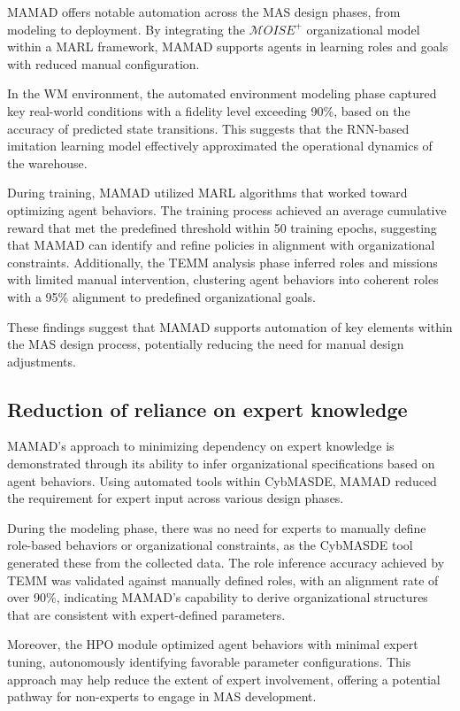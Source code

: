 \documentclass[pdflatex,sn-mathphys-num]{sn-jnl}%
\theoremstyle{thmstyleone}%
\theoremstyle{thmstyletwo}%
\theoremstyle{thmstylethree}%
\begin{document}
MAMAD offers notable automation across the MAS design phases, from modeling to deployment. By integrating the $\mathcal{M}OISE^+$ organizational model within a MARL framework, MAMAD supports agents in learning roles and goals with reduced manual configuration.

In the WM environment, the automated environment modeling phase captured key real-world conditions with a fidelity level exceeding 90\%, based on the accuracy of predicted state transitions. This suggests that the RNN-based imitation learning model effectively approximated the operational dynamics of the warehouse.

During training, MAMAD utilized MARL algorithms that worked toward optimizing agent behaviors. The training process achieved an average cumulative reward that met the predefined threshold within 50 training epochs, suggesting that MAMAD can identify and refine policies in alignment with organizational constraints. Additionally, the TEMM analysis phase inferred roles and missions with limited manual intervention, clustering agent behaviors into coherent roles with a 95\% alignment to predefined organizational goals.

These findings suggest that MAMAD supports automation of key elements within the MAS design process, potentially reducing the need for manual design adjustments.

\subsection{Reduction of reliance on expert knowledge}

MAMAD's approach to minimizing dependency on expert knowledge is demonstrated through its ability to infer organizational specifications based on agent behaviors. Using automated tools within CybMASDE, MAMAD reduced the requirement for expert input across various design phases.

During the modeling phase, there was no need for experts to manually define role-based behaviors or organizational constraints, as the CybMASDE tool generated these from the collected data. The role inference accuracy achieved by TEMM was validated against manually defined roles, with an alignment rate of over 90\%, indicating MAMAD's capability to derive organizational structures that are consistent with expert-defined parameters. 

Moreover, the HPO module optimized agent behaviors with minimal expert tuning, autonomously identifying favorable parameter configurations. This approach may help reduce the extent of expert involvement, offering a potential pathway for non-experts to engage in MAS development.
\end{document}
